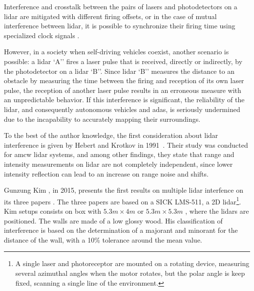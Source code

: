 Interference and crosstalk between the pairs of \acp{laser} and photodetectors on a \ac{lidar} are mitigated with different firing offsets, or in the case of mutual interference between \ac{lidar}, it is possible to synchronize their firing time using specialized clock signals \cite{vlp16}.

However, in a society when self-driving vehicles coexist, another scenario is possible: a \ac{lidar} `A'' fires a \ac{laser} pulse that is received, directly or indirectly, by the photodetector on a \ac{lidar} `B''. Since \ac{lidar} `B'' measures the distance to an obstacle by measuring the time between the firing and reception of its own \ac{laser} pulse, the reception of another \ac{laser} pulse results in an erroneous measure with an unpredictable behavior. If this interference is significant, the reliability of the \ac{lidar}, and consequently autonomous vehicles and \ac{adas}, is seriously undermined due to the incapability to accurately mapping their surroundings.



To the best of the author knowledge, the first consideration about \ac{lidar} interference is given by Hebert and Krotkov in 1991~\cite{Heberta}. Their study was conducted for \ac{amcw} \ac{lidar} systems, and among other findings, they state that range and intensity measurements on \ac{lidar} are not completely independent, since lower intensity reflection can lead to an increase on range noise and shifts. 

Gunzung Kim \etal, in 2015, presents the first results on multiple \ac{lidar} interfence on its three papers \cite{Kim2015a, Kim2015b, Kim2015c}. The three papers are based on a SICK LMS-511, a 2D \ac{lidar}\footnote{A single laser and photoreceptor are mounted on a rotating device, measuring several azimuthal angles when the motor rotates, but the polar angle is keep fixed, scanning a single line of the environment.}. Kim \etal setups consists on box with $5.3m \times 4m$ \cite{Kim2015a} or $5.3m \times 5.3m$ \cite{Kim2015b, Kim2015c}, where the \acp{lidar} are positioned. The walls are made of a low glossy wood. His classification of interference is based on the determination of a majorant and minorant for the distance of the wall, with a 10\% tolerance around the mean value.


